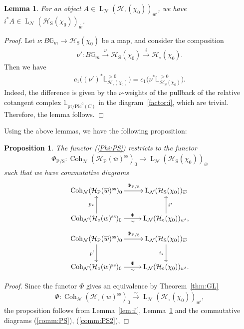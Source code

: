 \documentclass[11pt,oneside,a4paper,mathscr]{amsart}
\newtheorem{prop}[thm]{Proposition}
\newtheorem{lemma}[thm]{Lemma}
\theoremstyle{definition}
\newcommand{\LL}{\operatorname{L}}
\newcommand{\cH}{\mathcal{H}}
\newcommand{\bgm}{B\mathbb{G}_m}
\newcommand{\Coh}{\operatorname{Coh}}
\newcommand{\rS}{\mathrm{S}}
\newcommand{\rP}{\mathrm{P}}
\begin{document}
\begin{lemma}\label{lem:i!2}
For an object $A\in \LL_{\mathcal{N}}(\cH_{\circ}(\chi_0))_{w'}$, 
we have $i^* A \in \LL_{\mathcal{N}}(\cH_{\rS}(\chi_0))_{\overline{w}}$.
\end{lemma}
\begin{proof}
Let $\nu \colon \bgm \to \cH_{\rS}(\chi_0)$ be a map, and consider the composition 
\begin{align*}
    \nu' \colon 
    \bgm \stackrel{\nu}{\to} \cH_{\rS}(\chi_0) 
    \stackrel{i}{\to} \cH_{\circ}(\chi_0).
\end{align*}
Then we have 
\begin{align*}
    c_1\bigl((\nu')^* \mathbb{L}_{\cH_{\circ}(\chi_0)}^{>0}\bigr)
    =
    c_1\bigl(\nu^*\mathbb{L}_{\cH_{\rS}(\chi_0)}^{>0}\bigr).
\end{align*}
Indeed, the difference is given by the $\nu$-weights of the pullback of 
the relative cotangent complex $\mathbb{L}_{\mathrm{pt}/\mathrm{Pic}^0(C)}$ 
in the diagram~\eqref{factor:i}, which are trivial. Therefore, the lemma follows.
\end{proof}

Using the above lemmas, we have the following proposition: 
\begin{prop}\label{prop:restL}
The functor (\ref{Phi:PS})
   restricts to the functor 
   \begin{align}\label{funct:PhiPSL}
   \Phi_{\rP/\rS} \colon
\Coh_{\mathcal{N}}(\cH_{\mathrm{P}}(\overline{w})^{\mathrm{ss}})_0
\to
\LL_{\mathcal{N}}(\cH_{\rS}(\chi_0))_{\overline{w}}
\end{align}
such that 
we have commutative diagrams 
\begin{align}\label{comm:PSL}
\xymatrix{
\Coh_{\mathcal{N}}(\cH_{\mathrm{P}}(\overline{w})^{\mathrm{ss}})_0
\ar[r]^-{\Phi_{\rP/\rS}}
&
\LL_{\mathcal{N}}(\cH_{\rS}(\chi_0))_{\overline{w}}
\\
\Coh_{\mathcal{N}}(\cH_{\circ}(w)^{\mathrm{ss}})_0
\ar[r]^-{\Phi}_-{\sim}
\ar[u]^-{p_*}
&
\LL_{\mathcal{N}}(\cH_{\circ}(\chi_0))_{w'}
\ar[u]_-{i^*},
}
\end{align}
\begin{align}\label{comm:PS2L}
\xymatrix{
\Coh_{\mathcal{N}}(\cH_{\mathrm{P}}(\overline{w})^{\mathrm{ss}})_0
\ar[r]^-{\Phi_{\rP/\rS}} \ar[d]_-{p^!}
&
\LL_{\mathcal{N}}(\cH_{\rS}(\chi_0))_{\overline{w}} \ar[d]_-{i_{*}}
\\
\Coh_{\mathcal{N}}(\cH_{\circ}(w)^{\mathrm{ss}})_0
\ar[r]^-{\Phi}_-{\sim}
&
\LL_{\mathcal{N}}(\cH_{\circ}(\chi_0))_{w'}.
}
\end{align}
\end{prop}
\begin{proof}
Since the functor $\Phi$ gives an equivalence by Theorem~\ref{thm:GL}
\begin{align*}
    \Phi \colon \Coh_{\mathcal{N}}(\cH_{\circ}(w)^{\mathrm{ss}})_0 \stackrel{\sim}{\to} \LL_{\mathcal{N}}(\cH_{\circ}(\chi_0))_{w'},
\end{align*}
the proposition follows from Lemma~\ref{lem:i!}, Lemma~\ref{lem:i!2} and 
 the commutative diagrams (\ref{comm:PS}), (\ref{comm:PS2}), 
\end{proof}
\end{document}
